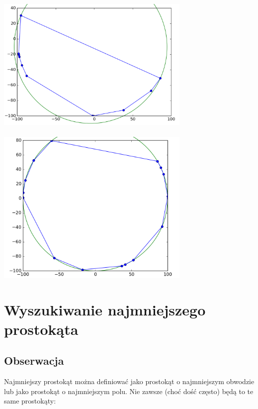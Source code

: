 \documentclass[hidelinks]{article}
\begin{document}
\begin{center}
\includegraphics[width=0.7\textwidth]{pics/halfcircle/007.png}\\ ~ \\
\includegraphics[width=0.7\textwidth]{pics/circle/005.png}
\end{center}

\newpage

\section{Wyszukiwanie najmniejszego prostokąta}

\subsection{Obserwacja}

Najmniejszy prostokąt można definiować jako prostokąt o najmniejszym obwodzie lub jako prostokąt o najmniejszym polu. Nie zawsze (choć dość często) będą to te same prostokąty: \\
\end{document}
